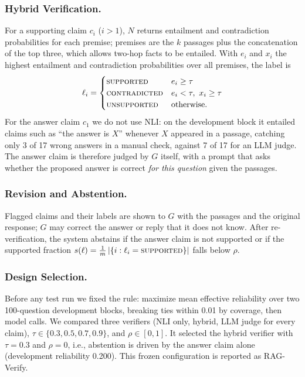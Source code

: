 \documentclass{svproc}
\begin{document}
\subsubsection{Hybrid Verification.} For a supporting claim $c_i$ ($i>1$), $N$ returns entailment and contradiction probabilities for each premise; premises are the $k$ passages plus the concatenation of the top three, which allows two-hop facts to be entailed. With $e_i$ and $x_i$ the highest entailment and contradiction probabilities over all premises, the label is
\begin{equation}
\ell_i=\begin{cases}\textsc{supported} & e_i\ge\tau\\ \textsc{contradicted} & e_i<\tau,\ x_i\ge\tau\\ \textsc{unsupported} & \text{otherwise.}\end{cases}\label{eq:label}
\end{equation}
For the answer claim $c_1$ we do not use NLI: on the development block it entailed claims such as ``the answer is $X$'' whenever $X$ appeared in a passage, catching only 3 of 17 wrong answers in a manual check, against 7 of 17 for an LLM judge. The answer claim is therefore judged by $G$ itself, with a prompt that asks whether the proposed answer is correct \emph{for this question} given the passages.

\subsubsection{Revision and Abstention.} Flagged claims and their labels are shown to $G$ with the passages and the original response; $G$ may correct the answer or reply that it does not know. After re-verification, the system abstains if the answer claim is not supported or if the supported fraction $s(\ell)=\frac{1}{m}\,|\{i:\ell_i=\textsc{supported}\}|$ falls below $\rho$.

\subsubsection{Design Selection.} Before any test run we fixed the rule: maximize mean effective reliability over two 100-question development blocks, breaking ties within 0.01 by coverage, then model calls. We compared three verifiers (NLI only, hybrid, LLM judge for every claim), $\tau\in\{0.3,0.5,0.7,0.9\}$, and $\rho\in[0,1]$. It selected the hybrid verifier with $\tau=0.3$ and $\rho=0$, i.e., abstention is driven by the answer claim alone (development reliability 0.200). This frozen configuration is reported as RAG-Verify.
\end{document}
